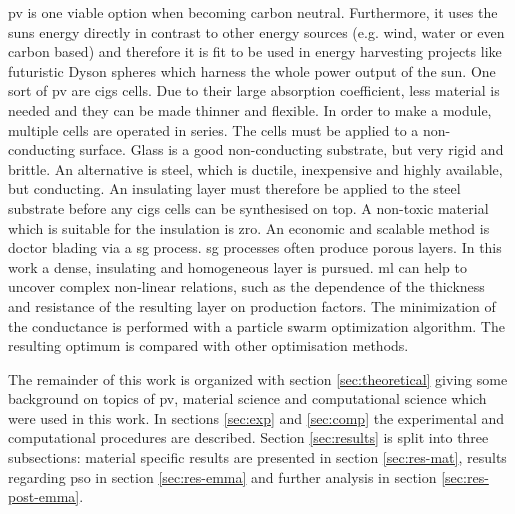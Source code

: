 \Gls{pv} is one viable option when becoming carbon neutral. 
Furthermore, 
it uses the suns energy directly in contrast to other energy sources (e.g. wind, water or even carbon based) and therefore 
it is fit to be used in energy harvesting projects like futuristic Dyson spheres\cite{dyson1960search} which harness the whole power output of the sun.
%
One sort of \gls{pv} are \gls{cigs}\cite{Vasekar2010} cells. 
Due to their large absorption coefficient, less material is needed and they can be made thinner and flexible. 
In order to make a module, multiple cells are operated in series. 
The cells must be applied to a non-conducting surface.
Glass is a good non-conducting substrate, but very rigid and brittle. 
An alternative is steel, which is ductile, inexpensive and highly available, but conducting. 
An insulating layer must therefore be applied to the steel substrate before any \gls{cigs} cells can be synthesised on top.
A non-toxic material which is suitable for the insulation is \gls{zro}. 
An economic and scalable method is doctor blading via a \gls{sg} process. 
\gls{sg} processes often produce porous layers. 
In this work a dense, insulating and homogeneous layer is pursued. 
\Gls{ml} can help to uncover complex non-linear relations, such as the 
dependence of the thickness and resistance of the resulting layer on production factors.
The minimization of the conductance is performed with a particle swarm optimization 
algorithm. 
The resulting optimum is compared with other optimisation methods.


The remainder of this work is organized with section 
\ref{sec:theoretical} giving 
some background on topics of \gls{pv}, material science and computational science which were used in this work.
In sections \ref{sec:exp} and \ref{sec:comp} the experimental and computational procedures are described. 
Section \ref{sec:results} is split into three subsections: material specific results are presented in section \ref{sec:res-mat}, results regarding \gls{pso} in section \ref{sec:res-emma} and further analysis in section \ref{sec:res-post-emma}.


